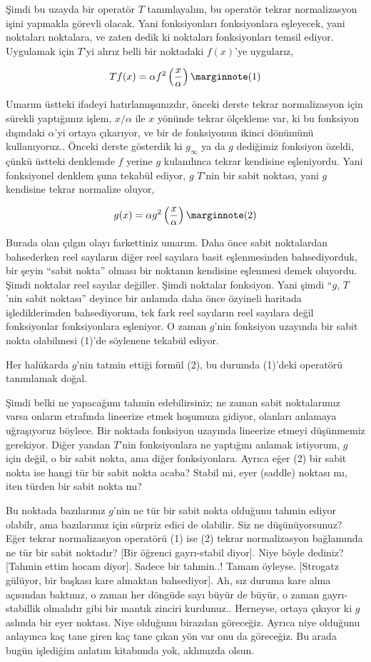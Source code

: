 \documentclass[12pt,fleqn]{article}\usepackage{../../common}
\begin{document}
Şimdi bu uzayda bir operatör $T$ tanımlayalım, bu operatör tekrar normalizasyon
işini yapmakla görevli olacak. Yani fonksiyonları fonksiyonlara eşleyecek, yani
noktaları noktalara, ve zaten dedik ki noktaları fonksiyonları temsil
ediyor. Uygulamak için $T$'yi alırız belli bir noktadaki $f(x)$'ye
uygularız,

$$
T f(x) = \alpha f^2 \left( \frac{x}{\alpha} \right) 
\mlabel{1}
$$

Umarım üstteki ifadeyi hatırlamışsınızdır, önceki derste tekrar normalizasyon
için sürekli yaptığımız işlem, $x/\alpha$ ile $x$ yönünde tekrar ölçekleme var,
ki bu fonksiyon dışındaki $\alpha$'yi ortaya çıkarıyor, ve bir de fonksiyonun
ikinci dönümünü kullanıyoruz.. Önceki derste gösterdik ki $g_\infty$ ya da $g$
dediğimiz fonksiyon özeldi, çünkü üstteki denklemde $f$ yerine $g$ kulanılınca
tekrar kendisine eşleniyordu. Yani fonksiyonel denklem şuna tekabül ediyor, $g$
$T$'nin bir sabit noktası, yani $g$ kendisine tekrar normalize oluyor,

$$ g(x) = \alpha g^2 \left( \frac{x}{\alpha} \right) 
\mlabel{2} $$

Burada olan çılgın olayı farkettiniz umarım. Daha önce sabit noktalardan
bahsederken reel sayıların diğer reel sayılara basit eşlenmesinden
bahsediyorduk, bir şeyin ``sabit nokta'' olması bir noktanın kendisine eşlenmesi
demek oluyordu. Şimdi noktalar reel sayılar değiller. Şimdi noktalar
fonksiyon. Yani şimdi ``$g$, $T$'nin sabit noktası'' deyince bir anlamda daha
önce özyineli haritada işlediklerimden bahsediyorum, tek fark reel sayıların
reel sayılara değil fonksiyonlar fonksiyonlara eşleniyor.  O zaman $g$'nin
fonksiyon uzayında bir sabit nokta olabilmesi (1)'de söylenene tekabül ediyor.

Her halükarda $g$'nin tatmin ettiği formül (2), bu durumda (1)'deki operatörü
tanımlamak doğal. 

Şimdi belki ne yapacağımı tahmin edebilirsiniz; ne zaman sabit noktalarımız
varsa onların etrafında lineerize etmek hoşumuza gidiyor, olanları anlamaya
uğraşıyoruz böylece. Bir noktada fonksiyon uzayında lineerize etmeyi düşünmemiz
gerekiyor. Diğer yandan $T$'nin fonksiyonlara ne yaptığını anlamak istiyorum,
$g$ için değil, o bir sabit nokta, ama diğer fonksiyonlara. Ayrıca eğer (2) bir
sabit nokta ise hangi tür bir sabit nokta acaba? Stabil mi, eyer (saddle)
noktası mı, iten türden bir sabit nokta mı?

Bu noktada bazılarınız $g$'nin ne tür bir sabit nokta olduğunu tahmin ediyor
olabilr, ama bazılarımız için sürpriz edici de olabilir. Siz ne düşünüyorsunuz?
Eğer tekrar normalizasyon operatörü (1) ise (2) tekrar normalizasyon bağlamında
ne tür bir sabit noktadır? [Bir öğrenci gayrı-stabil diyor]. Niye böyle dediniz?
[Tahmin ettim hocam diyor]. Sadece bir tahmin..! Tamam öyleyse. [Strogatz
  gülüyor, bir başkası kare almaktan bahsediyor]. Ah, sız duruma kare alma
açısından baktınız, o zaman her döngüde sayı büyür de büyür, o zaman
gayrı-stabillik olmalıdır gibi bir mantık zinciri kurdunuz.. Herneyse, ortaya
çıkıyor ki $g$ aslında bir eyer noktası. Niye olduğunu birazdan göreceğiz.
Ayrıca niye olduğunu anlayınca kaç tane giren kaç tane çıkan yön var onu da
göreceğiz. Bu arada bugün işlediğim anlatım kitabımda yok, aklımızda olsun.
\end{document}
